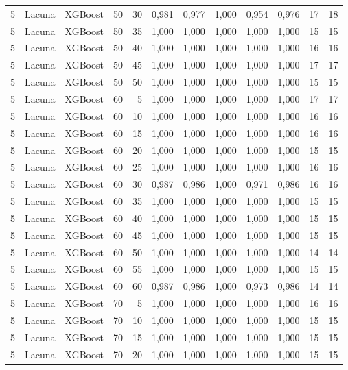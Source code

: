 \begin{longtable}{@{}rllrrrrrrrrr@{}}
5 & Lacuna & XGBoost & 50 & 30 & 0,981 & 0,977 & 1,000 & 0,954 & 0,976 & 17 & 18 \\
5 & Lacuna & XGBoost & 50 & 35 & 1,000 & 1,000 & 1,000 & 1,000 & 1,000 & 15 & 15 \\
5 & Lacuna & XGBoost & 50 & 40 & 1,000 & 1,000 & 1,000 & 1,000 & 1,000 & 16 & 16 \\
5 & Lacuna & XGBoost & 50 & 45 & 1,000 & 1,000 & 1,000 & 1,000 & 1,000 & 17 & 17 \\
5 & Lacuna & XGBoost & 50 & 50 & 1,000 & 1,000 & 1,000 & 1,000 & 1,000 & 15 & 15 \\
5 & Lacuna & XGBoost & 60 & 5 & 1,000 & 1,000 & 1,000 & 1,000 & 1,000 & 17 & 17 \\
5 & Lacuna & XGBoost & 60 & 10 & 1,000 & 1,000 & 1,000 & 1,000 & 1,000 & 16 & 16 \\
5 & Lacuna & XGBoost & 60 & 15 & 1,000 & 1,000 & 1,000 & 1,000 & 1,000 & 16 & 16 \\
5 & Lacuna & XGBoost & 60 & 20 & 1,000 & 1,000 & 1,000 & 1,000 & 1,000 & 15 & 15 \\
5 & Lacuna & XGBoost & 60 & 25 & 1,000 & 1,000 & 1,000 & 1,000 & 1,000 & 16 & 16 \\
5 & Lacuna & XGBoost & 60 & 30 & 0,987 & 0,986 & 1,000 & 0,971 & 0,986 & 16 & 16 \\
5 & Lacuna & XGBoost & 60 & 35 & 1,000 & 1,000 & 1,000 & 1,000 & 1,000 & 15 & 15 \\
5 & Lacuna & XGBoost & 60 & 40 & 1,000 & 1,000 & 1,000 & 1,000 & 1,000 & 15 & 15 \\
5 & Lacuna & XGBoost & 60 & 45 & 1,000 & 1,000 & 1,000 & 1,000 & 1,000 & 15 & 15 \\
5 & Lacuna & XGBoost & 60 & 50 & 1,000 & 1,000 & 1,000 & 1,000 & 1,000 & 14 & 14 \\
5 & Lacuna & XGBoost & 60 & 55 & 1,000 & 1,000 & 1,000 & 1,000 & 1,000 & 15 & 15 \\
5 & Lacuna & XGBoost & 60 & 60 & 0,987 & 0,986 & 1,000 & 0,973 & 0,986 & 14 & 14 \\
5 & Lacuna & XGBoost & 70 & 5 & 1,000 & 1,000 & 1,000 & 1,000 & 1,000 & 16 & 16 \\
5 & Lacuna & XGBoost & 70 & 10 & 1,000 & 1,000 & 1,000 & 1,000 & 1,000 & 15 & 15 \\
5 & Lacuna & XGBoost & 70 & 15 & 1,000 & 1,000 & 1,000 & 1,000 & 1,000 & 15 & 15 \\
5 & Lacuna & XGBoost & 70 & 20 & 1,000 & 1,000 & 1,000 & 1,000 & 1,000 & 15 & 15 \\

\end{longtable}
